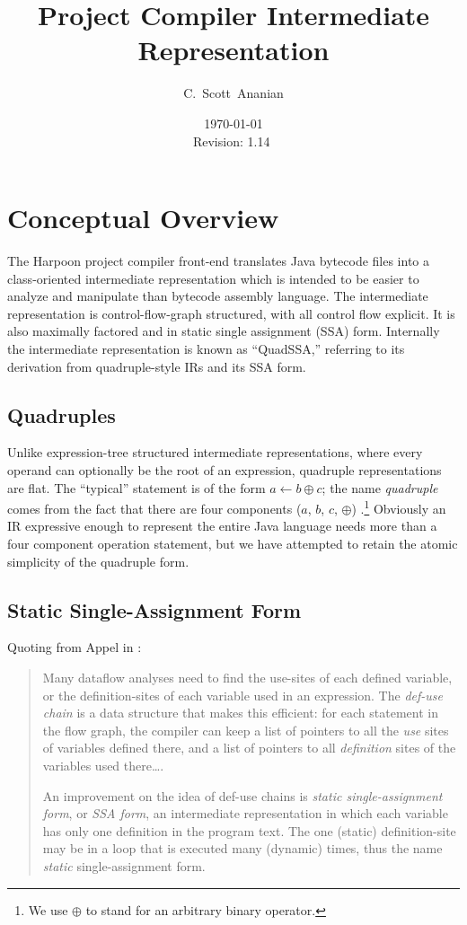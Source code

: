 \documentclass[11pt,notitlepage,twocolumn,twoside]{article}
\author{C.~Scott~Ananian}
\title{\Harpoon{} Project Compiler Intermediate Representation}
\date{\today \\ $ $Revision: 1.14 $ $}
\newcommand{\Harpoon}{Harpoon}%
\begin{document}

\maketitle

\section{Conceptual Overview}

The \Harpoon{} project compiler front-end translates Java bytecode files
into a class-oriented intermediate representation which is intended to
be easier to analyze and manipulate than bytecode assembly language.
The intermediate representation is control-flow-graph structured, with
all control flow explicit.  It is also maximally factored and in
static single assignment (SSA) form.  Internally the intermediate
representation is known as ``QuadSSA,'' referring
to its derivation from quadruple-style IRs and its SSA form.

\subsection{Quadruples}
Unlike expression-tree structured intermediate representations, where
every operand can optionally be the root of an expression, quadruple
representations are flat.  The ``typical'' statement is of the form
$a \leftarrow b \oplus c$; the name \textit{quadruple} comes from the fact
that there are four components ($a$, $b$, $c$, $\oplus$)
\cite{appel:modern}.\footnote{We use $\oplus$ to stand for an arbitrary
binary operator.}  Obviously an IR expressive enough to represent the
entire Java language needs more than a four component operation
statement, but we have attempted to retain the atomic simplicity
of the quadruple form.

\subsection{Static Single-Assignment Form}

Quoting from Appel in \cite{appel:modern}:
\begin{quote}
Many dataflow analyses need to find the use-sites of each defined
variable, or the definition-sites of each variable used in an
expression.  The \textit{def-use chain} is a data structure that makes
this efficient: for each statement in the flow graph, the compiler can
keep a list of pointers to all the \textit{use} sites of variables
defined there, and a list of pointers to all \textit{definition} sites
of the variables used there\ldots .

An improvement on the idea of def-use chains is \textit{static
single-assignment form}, or \textit{SSA form}, an intermediate
representation in which each variable has only one definition in the
program text.  The one (static) definition-site may be in a loop that
is executed many (dynamic) times, thus the name \textit{static}
single-assignment form.
\end{quote}
\end{document}
